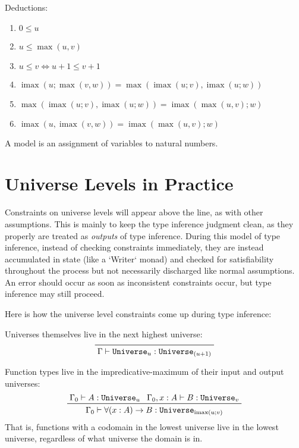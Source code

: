 \documentclass[11pt, twoside, reqno]{book}
\DeclareMathOperator{\imax}{imax}
\begin{document}
Deductions:
\label{alg-uni-laws-more}
\begin{enumerate}
\item $0 \le u$
\item $u \le \max(u, v)$
\item $u \le v \iff u+1 \le v+1$
\item $\imax(u; \max(v, w)) = \max(\imax(u; v), \imax(u; w))$
\item $\max(\imax(u; v), \imax(u; w)) = \imax(\max(u, v); w)$
\item $\imax(u, \imax(v, w)) = \imax(\max(u, v); w)$
\end{enumerate}

A model is an assignment of variables to natural numbers.

\section{Universe Levels in Practice}
\label{uni-lvl-prac}

Constraints on universe levels will appear above the line, as with other assumptions.
This is mainly to keep the type inference judgment clean, as they properly are treated as \emph{outputs} of type inference.
During this model of type inference, instead of checking constraints immediately, they are instead accumulated in state (like a \inHS`Writer` monad) and checked for satisfiability throughout the process but not necessarily discharged like normal assumptions.
An error should occur as soon as inconsistent constraints occur, but type inference may still proceed.

Here is how the universe level constraints come up during type inference:

Universes themselves live in the next highest universe:
\begin{displaymath}
\prftree{\Gamma \vdash \texttt{Universe}_u : \texttt{Universe}_{(u+1)}}
\end{displaymath}

Function types live in the impredicative-maximum of their input and output universes:
\begin{displaymath}
\prftree
  {\Gamma_0 \vdash A : \texttt{Universe}_u}
  {\Gamma_0, x : A \vdash B : \texttt{Universe}_v}
  {\Gamma_0 \vdash \forall (x : A) \to B : \texttt{Universe}_{\imax(u; v)}}
\end{displaymath}
That is, functions with a codomain in the lowest universe live in the lowest universe, regardless of what universe the domain is in.
\end{document}
